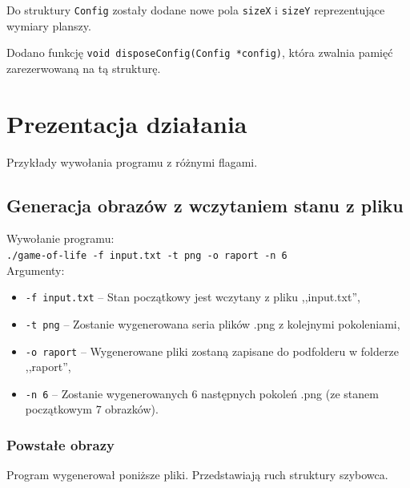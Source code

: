 \documentclass{mwart}
\begin{document}
Do struktury \texttt{Config} zostały dodane nowe pola \texttt{sizeX} i \texttt{sizeY} reprezentujące wymiary planszy. 

Dodano funkcję \texttt{void disposeConfig(Config *config)}, która zwalnia pamięć zarezerwowaną na tą strukturę.

\section{Prezentacja działania}


Przykłady wywołania programu z różnymi flagami.

\subsection{Generacja obrazów z wczytaniem stanu z pliku}
\noindent{}Wywołanie programu: \\
\texttt{./game-of-life -f input.txt -t png -o raport -n 6} \\
Argumenty:
\begin{itemize}
\item \texttt{-f input.txt} -- Stan początkowy jest wczytany z pliku ,,input.txt'',
\item \texttt{-t png} -- Zostanie wygenerowana seria plików .png z kolejnymi pokoleniami,
\item \texttt{-o raport} -- Wygenerowane pliki zostaną zapisane do podfolderu w folderze ,,raport'',
\item \texttt{-n 6} -- Zostanie wygenerowanych 6 następnych pokoleń .png (ze stanem początkowym 7 obrazków).
\end{itemize}

\subsubsection*{Powstałe obrazy}
Program wygenerował poniższe pliki. Przedstawiają ruch struktury szybowca.
\end{document}
